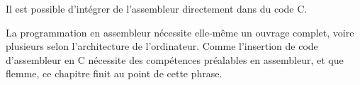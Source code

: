 \documentclass[../../../main.tex]{subfiles}
\begin{document}
Il est possible d'intégrer de l'assembleur directement dans du code C.

La programmation en assembleur nécessite elle-même un ouvrage complet, voire plusieurs selon l'architecture de l'ordinateur. Comme l'insertion de code d'assembleur en C nécessite des compétences préalables en assembleur, et que flemme, ce chapitre finit au point de cette phrase. 
\end{document}
